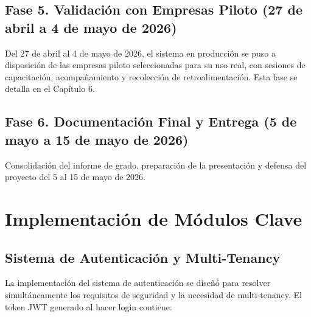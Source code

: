 \subsection{Fase 5. Validación con Empresas Piloto (27 de abril a 4 de mayo de 2026)}\label{fase-5.-validaciuxf3n-con-empresas-piloto-27-de-abril-a-4-de-mayo-de-2026}

Del 27 de abril al 4 de mayo de 2026, el sistema en producción se puso a disposición de las empresas piloto seleccionadas para su uso real, con sesiones de capacitación, acompañamiento y recolección de retroalimentación. Esta fase se detalla en el Capítulo 6.

\subsection{Fase 6. Documentación Final y Entrega (5 de mayo a 15 de mayo de 2026)}\label{fase-6.-documentaciuxf3n-final-y-entrega-5-de-mayo-a-15-de-mayo-de-2026}

Consolidación del informe de grado, preparación de la presentación y defensa del proyecto del 5 al 15 de mayo de 2026.

\section{Implementación de Módulos Clave}\label{implementaciuxf3n-de-muxf3dulos-clave}

\subsection{Sistema de Autenticación y Multi-Tenancy}\label{sistema-de-autenticaciuxf3n-y-multi-tenancy}

La implementación del sistema de autenticación se diseñó para resolver simultáneamente los requisitos de seguridad y la necesidad de multi-tenancy. El token JWT generado al hacer login contiene:

\begin{Shaded}
\begin{Highlighting}[]
\FunctionTok{\{}
  \FunctionTok{:} \FunctionTok{,}
  \FunctionTok{:} \FunctionTok{,}
  \FunctionTok{:} \FunctionTok{,}
  \FunctionTok{:} 
\FunctionTok{\}}
\end{Highlighting}
\end{Shaded}

